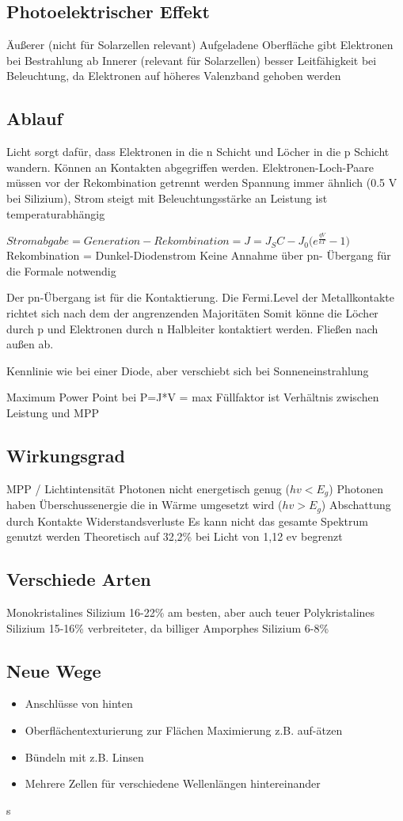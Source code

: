 \subsection{Photoelektrischer Effekt}
Äußerer (nicht für Solarzellen relevant)
Aufgeladene Oberfläche gibt Elektronen bei Bestrahlung ab
Innerer (relevant für Solarzellen)
besser Leitfähigkeit bei Beleuchtung, da Elektronen auf höheres Valenzband gehoben werden

\subsection{Ablauf}
Licht sorgt dafür, dass Elektronen in die n Schicht und Löcher in die p Schicht wandern. Können an Kontakten abgegriffen werden.
Elektronen-Loch-Paare müssen vor der Rekombination getrennt werden
Spannung immer ähnlich (0.5 V bei Silizium), Strom steigt mit Beleuchtungsstärke an
Leistung ist temperaturabhängig

$Stromabgabe = Generation - Rekombination = J = J_SC - J_0 \bigg(e^{\frac{qV}{kT}}-1\bigg)$
Rekombination = Dunkel-Diodenstrom
Keine Annahme über pn- Übergang für die Formale notwendig

Der pn-Übergang ist für die Kontaktierung. Die Fermi.Level der Metallkontakte richtet sich nach dem der angrenzenden Majoritäten
Somit könne die Löcher durch p und Elektronen durch n Halbleiter kontaktiert werden. Fließen nach außen ab.

Kennlinie wie bei einer Diode, aber verschiebt sich bei Sonneneinstrahlung

Maximum Power Point bei P=J*V = max
Füllfaktor ist Verhältnis zwischen Leistung und MPP

\subsection{Wirkungsgrad}
MPP / Lichtintensität
Photonen nicht energetisch genug ($hv < E_g$)
Photonen haben Überschussenergie die in Wärme umgesetzt wird ($hv > E_g$)
Abschattung durch Kontakte
Widerstandsverluste
Es kann nicht das gesamte Spektrum genutzt werden
Theoretisch auf 32,2\% bei Licht von 1,12 ev begrenzt

\subsection{Verschiede Arten}
Monokristalines Silizium 16-22\%
am besten, aber auch teuer
Polykristalines Silizium 15-16\%
verbreiteter, da billiger
Amporphes Silizium 	6-8\%

\subsection{Neue Wege}
\begin{itemize}
	\item Anschlüsse von hinten
	\item Oberflächentexturierung zur Flächen Maximierung z.B. auf-ätzen
	\item Bündeln mit z.B. Linsen
	\item Mehrere Zellen für verschiedene Wellenlängen hintereinander
\end{itemize}s